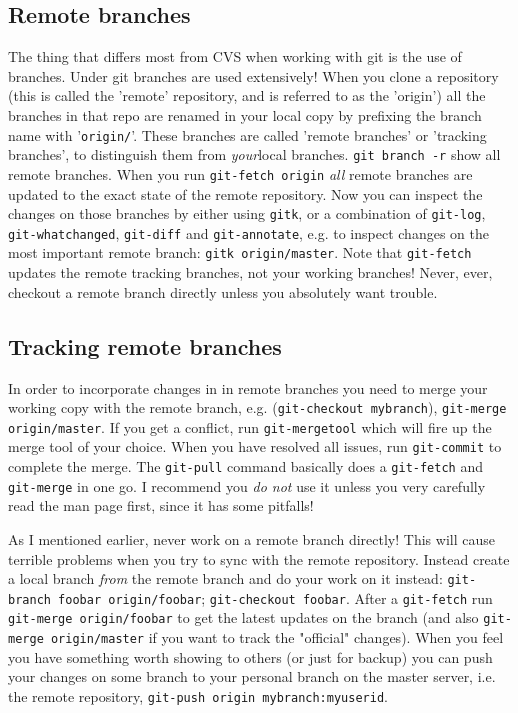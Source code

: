 \documentclass[a4paper,10pt]{article}
\begin{document}
\subsection{Remote branches}
The thing that differs most from CVS when working with git is the use of
branches. Under git branches are used extensively! When you clone a repository
(this is called the 'remote' repository, and is referred to as the 'origin')
all the branches in that repo are renamed in your local copy by prefixing the
branch name with '\texttt{origin/}'. These branches are called 'remote
branches' or 'tracking branches', to distinguish them from \emph{your}local
branches.  \texttt{git branch -r} show all remote branches. When you run
\texttt{git-fetch origin} \emph{all} remote branches are updated to the exact
state of the remote repository. Now you can inspect the changes on those
branches by either using \texttt{gitk}, or a combination of \texttt{git-log},
\texttt{git-whatchanged}, \texttt{git-diff} and \texttt{git-annotate}, e.g. to
inspect changes on the most important remote branch: \texttt{gitk
origin/master}. Note
that \texttt{git-fetch} updates the remote tracking branches, not your working branches!
Never, ever, checkout a remote branch directly unless you absolutely want
trouble. 

\subsection{Tracking remote branches}
In order to incorporate changes in in remote branches you need to merge your
working copy with the remote branch, e.g. (\texttt{git-checkout mybranch}),
\texttt{git-merge
origin/master}. If you get a conflict, run \texttt{git-mergetool} which will fire up the
merge tool of your choice. When you have resolved all issues, run
\texttt{git-commit}
to complete the merge. The \texttt{git-pull} command basically does a
\texttt{git-fetch} and
\texttt{git-merge} in one go. I recommend you \emph{do not} use it unless you very carefully
read the man page first, since it has some pitfalls!

As I mentioned earlier, never work on a remote branch directly! This will
cause terrible problems when you try to sync with the remote repository.
Instead create a local branch \emph{from} the remote branch and do your work
on it instead: \texttt{git-branch foobar origin/foobar}; \texttt{git-checkout
foobar}. After a \texttt{git-fetch} run \texttt{git-merge origin/foobar} to
get the latest updates on the branch (and also \texttt{git-merge
origin/master} if you want to track the "official" changes).  When you feel
you have something worth showing to others (or just for backup) you can push
your changes on some branch to your personal branch on the master server, i.e.
the remote repository, \texttt{git-push origin mybranch:myuserid}.
\end{document}
